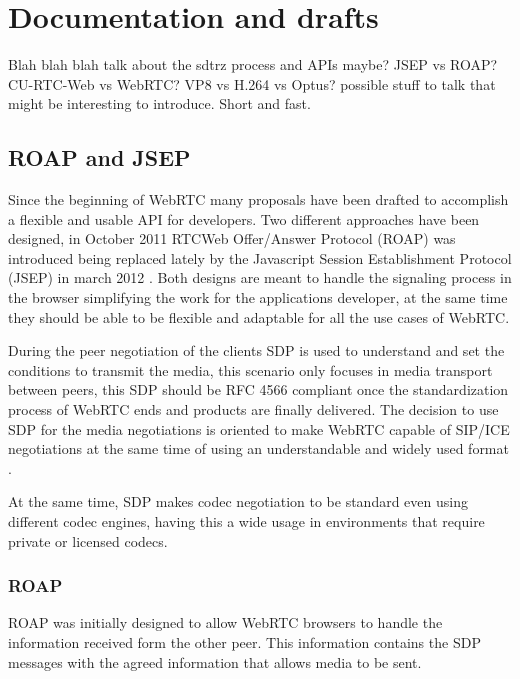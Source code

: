 \section{Documentation and drafts}

\thispagestyle{empty}

Blah blah blah talk about the sdtrz process and APIs maybe? JSEP vs ROAP? CU-RTC-Web vs WebRTC? VP8 vs H.264 vs Optus? possible stuff to talk that might be interesting to introduce. Short and fast.

\subsection{ROAP and JSEP}
Since the beginning of WebRTC many proposals have been drafted to accomplish a flexible and usable API for developers. Two different approaches have been designed, in October 2011 RTCWeb Offer/Answer Protocol (ROAP) \cite{roapIETF} was introduced being replaced lately by the Javascript Session Establishment Protocol (JSEP) in march 2012 \cite{jsepIETF}. Both designs are meant to handle the signaling process in the browser simplifying the work for the applications developer, at the same time they should be able to be flexible and adaptable for all the use cases of WebRTC. 

During the peer negotiation of the clients SDP is used to understand and set the conditions to transmit the media, this scenario only focuses in media transport between peers, this SDP should be RFC 4566 compliant once the standardization process of WebRTC ends and products are finally delivered. The decision to use SDP for the media negotiations is oriented to make WebRTC capable of SIP/ICE negotiations at the same time of using an understandable and widely used format \cite{alvestrandOverview2012}.  

At the same time, SDP makes codec negotiation to be standard even using different codec engines, having this a wide usage in environments that require private or licensed codecs.

\subsubsection{ROAP}
ROAP was initially designed to allow WebRTC browsers to handle the information received form the other peer. This information contains the SDP messages with the agreed information that allows media to be sent.

